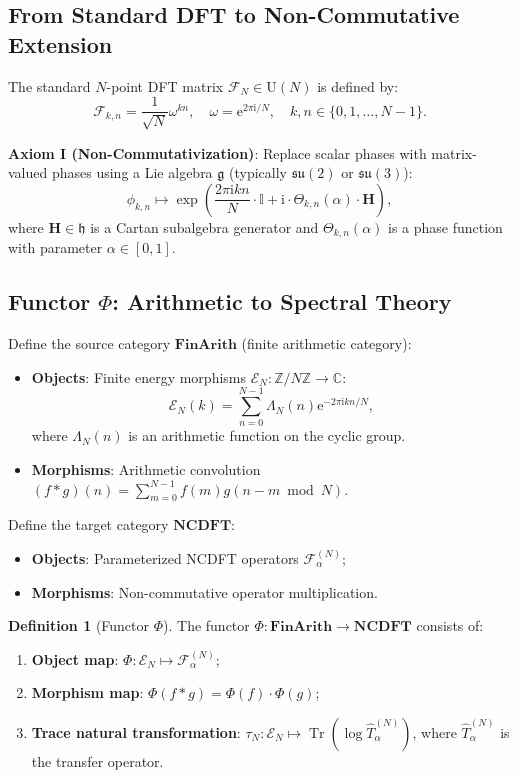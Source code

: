 \documentclass[12pt,a4paper]{article}
\theoremstyle{definition}
\newtheorem{definition}{Definition}[section]
\theoremstyle{plain}
\theoremstyle{remark}
\DeclareMathOperator{\Tr}{Tr}
\newcommand{\F}{\mathcal{F}}
\newcommand{\E}{\mathcal{E}}
\newcommand{\T}{\hat{T}}
\newcommand{\Z}{\mathbb{Z}}
\newcommand{\C}{\mathbb{C}}
\newcommand{\ee}{\mathrm{e}}
\newcommand{\ii}{\mathrm{i}}
\begin{document}
\subsection{From Standard DFT to Non-Commutative Extension}
The standard $N$-point DFT matrix $\F_N \in \mathrm{U}(N)$ is defined by:
\[
\F_{k,n} = \frac{1}{\sqrt{N}} \omega^{kn}, \quad \omega = \ee^{2\pi\ii/N}, \quad k,n \in \{0,1,\dots,N-1\}.
\]

\textbf{Axiom I (Non-Commutativization)}: Replace scalar phases with matrix-valued phases using a Lie algebra $\mathfrak{g}$ (typically $\mathfrak{su}(2)$ or $\mathfrak{su}(3)$):
\[
\phi_{k,n} \mapsto \exp\left(\frac{2\pi\ii kn}{N} \cdot \mathbb{I} + \ii \cdot \Theta_{k,n}(\alpha) \cdot \mathbf{H}\right),
\]
where $\mathbf{H} \in \mathfrak{h}$ is a Cartan subalgebra generator and $\Theta_{k,n}(\alpha)$ is a phase function with parameter $\alpha \in [0,1]$.

\subsection{Functor $\Phi$: Arithmetic to Spectral Theory}
Define the source category $\mathbf{FinArith}$ (finite arithmetic category):
\begin{itemize}
    \item \textbf{Objects}: Finite energy morphisms $\E_N: \Z/N\Z \to \C$:
    \[
    \E_N(k) = \sum_{n=0}^{N-1} \Lambda_N(n) \ee^{-2\pi\ii kn/N},
    \]
    where $\Lambda_N(n)$ is an arithmetic function on the cyclic group.
    \item \textbf{Morphisms}: Arithmetic convolution $(f * g)(n) = \sum_{m=0}^{N-1} f(m)g(n-m \bmod N)$.
\end{itemize}

Define the target category $\mathbf{NCDFT}$:
\begin{itemize}
    \item \textbf{Objects}: Parameterized NCDFT operators $\F_\alpha^{(N)}$;
    \item \textbf{Morphisms}: Non-commutative operator multiplication.
\end{itemize}

\begin{definition}[Functor $\Phi$]\label{def:functor}
The functor $\Phi: \mathbf{FinArith} \to \mathbf{NCDFT}$ consists of:
\begin{enumerate}
    \item \textbf{Object map}: $\Phi: \E_N \mapsto \F_\alpha^{(N)}$;
    \item \textbf{Morphism map}: $\Phi(f * g) = \Phi(f) \cdot \Phi(g)$;
    \item \textbf{Trace natural transformation}: $\tau_N: \E_N \mapsto \Tr(\log \T_\alpha^{(N)})$, where $\T_\alpha^{(N)}$ is the transfer operator.
\end{enumerate}
\end{definition}
\end{document}

